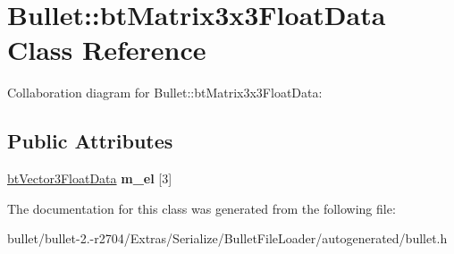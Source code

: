 \hypertarget{class_bullet_1_1bt_matrix3x3_float_data}{\section{Bullet\+:\+:bt\+Matrix3x3\+Float\+Data Class Reference}
\label{class_bullet_1_1bt_matrix3x3_float_data}
}


Collaboration diagram for Bullet\+:\+:bt\+Matrix3x3\+Float\+Data\+:
\subsection*{Public Attributes}
\begin{DoxyCompactItemize}
\item 
\hypertarget{class_bullet_1_1bt_matrix3x3_float_data_a408a25bda250261023cc33766ad69286}{\hyperlink{class_bullet_1_1bt_vector3_float_data}{bt\+Vector3\+Float\+Data} {\bfseries m\+\_\+el} \mbox{[}3\mbox{]}}\label{class_bullet_1_1bt_matrix3x3_float_data_a408a25bda250261023cc33766ad69286}

\end{DoxyCompactItemize}


The documentation for this class was generated from the following file\+:\begin{DoxyCompactItemize}
\item 
bullet/bullet-\/2.-\/r2704/\+Extras/\+Serialize/\+Bullet\+File\+Loader/autogenerated/bullet.\+h\end{DoxyCompactItemize}

